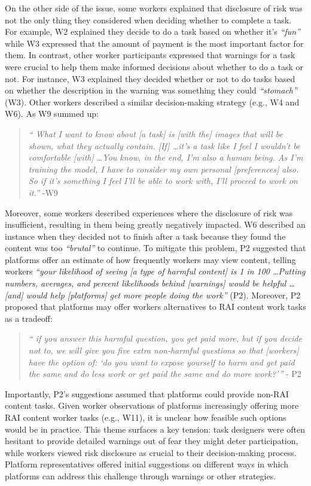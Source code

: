 On the other side of the issue, some workers explained that disclosure of risk was not the only thing they considered when deciding whether to complete a task. For example, W2 explained they decide to do a task based on whether it's \textit{``fun''} while W3 expressed that the amount of payment is the most important factor for them. In contrast, other worker participants expressed that warnings for a task were crucial to help them make informed decisions about whether to do a task or not. For instance, W3 explained they decided whether or not to do tasks based on whether the description in the warning was something they could \textit{``stomach''} (W3). Other workers described a similar decision-making strategy (e.g., W4 and W6). As W9 summed up: 
\begin{quote}
    \textit{`` What I want to know about [a task] is [with the] images that will be shown, what they actually contain. [If] \dots it's a task like I feel I wouldn't be comfortable [with] \dots You know, in the end, I'm also a human being. As I'm training the model, I have to consider my own personal [preferences] also. So if it's something I feel I'll be able to work with, I'll proceed to work on it.''} -W9
\end{quote}
Moreover, some workers described experiences where the disclosure of risk was insufficient, resulting in them being greatly negatively impacted. W6 described an instance when they decided not to finish after a task because they found the content was too \textit{``brutal''} to continue. 
To mitigate this problem, P2 suggested that platforms offer an estimate of how frequently workers may view content, telling workers \textit{``your likelihood of seeing [a type of harmful content] is 1 in 100 \dots Putting numbers, averages, and percent likelihoods behind [warnings] would be helpful \dots [and] would help [platforms] get more people doing the work''} (P2). Moreover, P2 proposed that platforms may offer workers alternatives to RAI content work tasks as a tradeoff: 
\begin{quote}
    \textit{`` if you answer this harmful question, you get paid more, but if you decide not to, we will give you five extra non-harmful questions so that [workers] have the option of: `do you want to expose yourself to harm and get paid the same and do less work or get paid the same and do more work?'''} - P2
\end{quote}
Importantly, P2's suggestions assumed that platforms could provide non-RAI content tasks. Given worker observations of platforms increasingly offering more RAI content worker tasks (e.g., W11), it is unclear how feasible such options would be in practice. 
This theme surfaces a key tension: task designers were often hesitant to provide detailed warnings out of fear they might deter participation, while workers viewed risk disclosure as crucial to their decision-making process. Platform representatives offered initial suggestions on different ways in which platforms can address this challenge through warnings or other strategies. 


